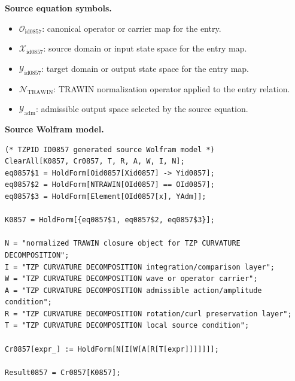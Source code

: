 \begin{minipage}[t]{0.49\linewidth}
\begingroup
\small
\raggedright
\textbf{Source equation symbols.}\par
\begin{itemize}[leftmargin=1.35em,itemsep=1pt,topsep=1pt,parsep=0pt]
    \item $\mathcal{O}_{\mathrm{id0857}}$: canonical operator or carrier map for the entry.
    \item $\mathcal{X}_{\mathrm{id0857}}$: source domain or input state space for the entry map.
    \item $\mathcal{Y}_{\mathrm{id0857}}$: target domain or output state space for the entry map.
    \item $\mathcal{N}_{\mathrm{TRAWIN}}$: TRAWIN normalization operator applied to the entry relation.
    \item $\mathcal{Y}_{\mathrm{adm}}$: admissible output space selected by the source equation.
\end{itemize}
\endgroup
\end{minipage}\hfill
\begin{minipage}[t]{0.47\linewidth}
\begingroup
\scriptsize
\raggedright
\textbf{Source Wolfram model.}\par
\begin{Verbatim}[fontsize=\tiny,breaklines=true,breakanywhere=true]
(* TZPID ID0857 generated source Wolfram model *)
ClearAll[K0857, Cr0857, T, R, A, W, I, N];
eq0857$1 = HoldForm[Oid0857[Xid0857] -> Yid0857];
eq0857$2 = HoldForm[NTRAWIN[OId0857] == OId0857];
eq0857$3 = HoldForm[Element[OId0857[x], YAdm]];

K0857 = HoldForm[{eq0857$1, eq0857$2, eq0857$3}];

N = "normalized TRAWIN closure object for TZP CURVATURE DECOMPOSITION";
I = "TZP CURVATURE DECOMPOSITION integration/comparison layer";
W = "TZP CURVATURE DECOMPOSITION wave or operator carrier";
A = "TZP CURVATURE DECOMPOSITION admissible action/amplitude condition";
R = "TZP CURVATURE DECOMPOSITION rotation/curl preservation layer";
T = "TZP CURVATURE DECOMPOSITION local source condition";

Cr0857[expr_] := HoldForm[N[I[W[A[R[T[expr]]]]]]];

Result0857 = Cr0857[K0857];
\end{Verbatim}
\endgroup
\end{minipage}

